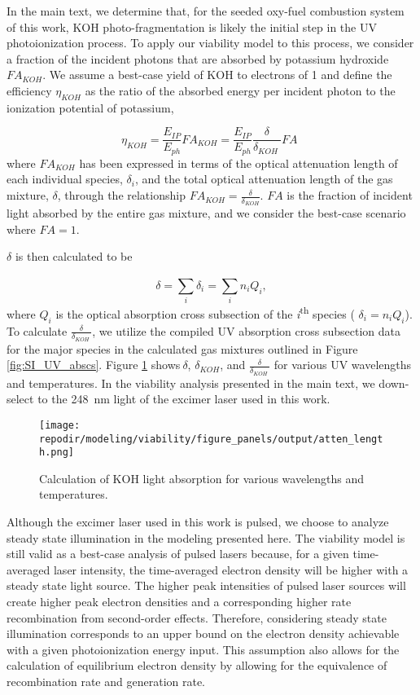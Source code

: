 In the main text, we determine that, for the seeded oxy-fuel combustion system of this work, KOH photo-fragmentation is likely the initial step in the UV photoionization process. To apply our viability model to this process, we consider a fraction of the incident photons that are absorbed by potassium hydroxide \(FA_{KOH}\). We assume a best-case yield of KOH to electrons of 1 and define the efficiency $\eta_{KOH}$ as the ratio of the absorbed energy per incident photon to the ionization potential of potassium,

\begin{equation}
\eta_{KOH} = \frac{E_{IP}}{E_{ph}}FA_{KOH} = \frac{E_{IP}}{E_{ph}}\frac{\delta}{\delta_{KOH}\ }FA\ \,
\end{equation}
where \(FA_{KOH}\) has been expressed in terms of the optical attenuation length of each individual species, \(\delta_{i}\), and the total optical attenuation length of the gas mixture, \(\delta\), through the relationship $FA_{KOH} = \frac{\delta}{\delta_{KOH}}$. $FA$ is the fraction of incident light absorbed by the entire gas mixture, and we consider the best-case scenario where $FA = 1$. 

\(\delta\) is then calculated to be

\begin{equation}
\delta = \sum_{i}^{}\delta_{i} = \sum_{i}^{}{n_{i}Q_{i}},
\end{equation}
where \(Q_{i}\) is the optical absorption cross subsection of the \emph{i}\textsuperscript{th} species ( \(\delta_{i} = n_{i}Q_{i}\)). To calculate \(\frac{\delta}{\delta_{KOH}\ }\), we utilize the compiled UV absorption cross subsection data for the major species in the calculated gas mixtures outlined in Figure \ref{fig:SI_UV_abscs}. Figure \ref{fig:SI_atten_length} shows\(\ \delta\), \(\delta_{KOH}\), and \(\frac{\delta}{\delta_{KOH}\ }\) for various UV wavelengths and temperatures. In the viability analysis presented in the main text, we down-select to the \SI{248}{\nano\meter} light of the excimer laser used in this work.

\begin{figure}[ht]
    \centering
    \texttt{[image: \\repodir/modeling/viability/figure\_panels/output/atten\_length.png]}
    \caption{Calculation of KOH light absorption for various wavelengths and temperatures.}
    \label{fig:SI_atten_length}
\end{figure}

Although the excimer laser used in this work is pulsed, we choose to analyze steady state illumination in the modeling presented here. The viability model is still valid as a best-case analysis of pulsed lasers because, for a given time-averaged laser intensity, the time-averaged electron density will be higher with a steady state light source. The higher peak intensities of pulsed laser sources will create higher peak electron densities and a corresponding higher rate recombination from second-order effects. Therefore, considering steady state illumination corresponds to an upper bound on the electron density achievable with a given photoionization energy input. This assumption also allows for the calculation of equilibrium electron density by allowing for the equivalence of recombination rate and generation rate.

